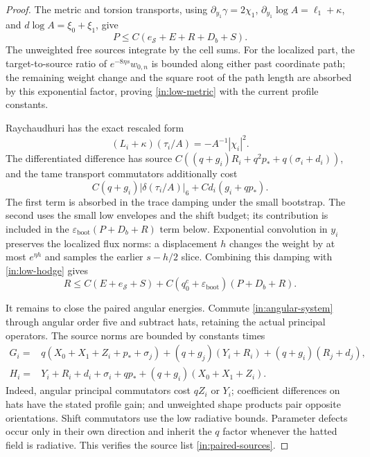 \begin{proof}
The metric and torsion transports, using
$\partial_{y_1}\gamma=2\chi_1$,
$\partial_{y_1}\log A=\ell_1+\kappa$, and
$d\log A=\xi_0+\xi_1$, give
\begin{equation}\label{in:low-metric}
 P\le C(e_{\mathcal S}+E+R+D_b+S).
\end{equation}
The unweighted free sources integrate by the cell sums. For the
localized part, the target-to-source ratio of
$e^{-8\eta s}w_{0,n}$ is bounded along either past coordinate path;
the remaining weight change and the square root of the path length
are absorbed by this exponential factor, proving
\eqref{in:low-metric} with the current profile constants.

Raychaudhuri has the exact rescaled form
\begin{equation}\label{in:trace-equation}
 (L_i+\kappa)(\tau_i/A)=-A^{-1}|\chi_i|^2.
\end{equation}
The differentiated difference has source
$C((q+g_i)R_i+q^2p_*+q(\sigma_i+d_i))$,
and the tame transport commutators additionally cost
\[
 C(q+g_i)|\delta(\tau_i/A)|_6
                 +C d_i(g_i+qp_*).
\]
The first term is absorbed in the trace damping under the small
bootstrap. The second uses the small low envelopes and the shift
budget; its contribution is included in the
$\varepsilon_{\mathrm{boot}}(P+D_b+R)$ term below.
Exponential convolution
in $y_i$ preserves the localized flux norms: a displacement $h$
changes the weight by at most $e^{\eta h}$ and samples the earlier
$s-h/2$ slice. Combining this damping with
\eqref{in:low-hodge} gives
\begin{equation}\label{in:low-shape}
 R\le C(E+e_{\mathcal S}+S)
       +C(q_0^c+\varepsilon_{\mathrm{boot}})(P+D_b+R).
\end{equation}

It remains to close the paired angular energies. Commute
\eqref{in:angular-system} through angular order five and subtract
hats, retaining the actual principal operators. The source norms are
bounded by constants times
\begin{equation}\label{in:paired-sources}
\begin{aligned}
 G_i={}&q(X_0+X_1+Z_i+p_*+\sigma_j)
       +(q+g_j)(Y_i+R_i)+(q+g_i)(R_j+d_j),\\
 H_i={}&Y_i+R_i+d_i+\sigma_i+qp_*
       +(q+g_i)(X_0+X_1+Z_i).
\end{aligned}
\end{equation}
Indeed, angular principal commutators cost $qZ_i$ or $Y_i$;
coefficient differences on hats have the stated profile gain; and
unweighted shape products pair opposite orientations. Shift
commutators use the low radiative bounds. Parameter defects occur
only in their own direction and inherit the $q$ factor whenever the
hatted field is radiative. This verifies the source list \eqref{in:paired-sources}.


\end{proof}
